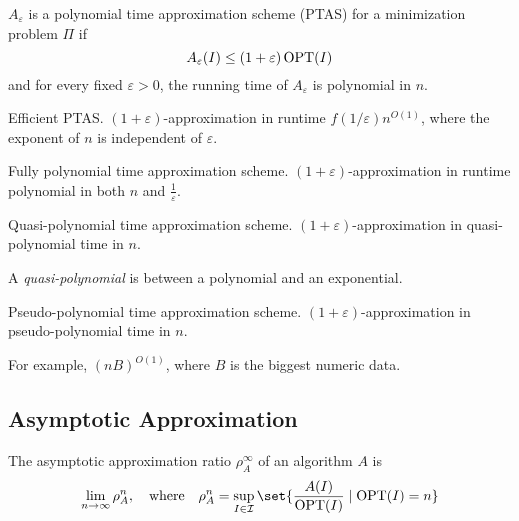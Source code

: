 \begin{definition}
    $A_\varepsilon$ is a polynomial time approximation scheme (PTAS) for a
    minimization problem $\Pi$ if \[
        A_\varepsilon(I) \le (1+\varepsilon) \operatorname{OPT}(I)
    \]
    and for every fixed $\varepsilon > 0$, the running time of $A_\varepsilon$
    is polynomial in $n$.
\end{definition}
\begin{definition}[EPTAS] \label{def:approx:eptas}
    Efficient PTAS.
    $(1+\varepsilon)$-approximation in runtime $f(1 / \varepsilon) n^{O(1)}$,
    where the exponent of $n$ is independent of $\varepsilon$.
\end{definition}
\begin{definition}[FPTAS] \label{def:approx:fptas}
    Fully polynomial time approximation scheme.
    $(1+\varepsilon)$-approximation in runtime polynomial in both $n$ and
    $\frac1\varepsilon$.
\end{definition}
\begin{definition}[QPTAS] \label{def:approx:qptas}
    Quasi-polynomial time approximation scheme.
    $(1+\varepsilon)$-approximation in quasi-polynomial time in $n$.

    A \emph{quasi-polynomial} is between a polynomial and an exponential.
\end{definition}
\begin{definition}[PPTAS] \label{def:approx:pptas}
    Pseudo-polynomial time approximation scheme.
    $(1+\varepsilon)$-approximation in pseudo-polynomial time in $n$.

    For example, $(nB)^{O(1)}$, where $B$ is the biggest numeric data.
\end{definition}

\subsection{Asymptotic Approximation} \label{sec:asymptotic_approximation}
\begin{definition}
    The asymptotic approximation ratio $\rho_A^\infty$ of an algorithm $A$ is \[
        \lim_{n \to \infty} \rho_A^n, \quad \text{where} \quad
        \rho_A^n = \sup_{I \in \mathcal{I}} \set{\frac{A(I)}{\OPT(I)} \large\mid
        \OPT(I) = n}
    \]
\end{definition}


